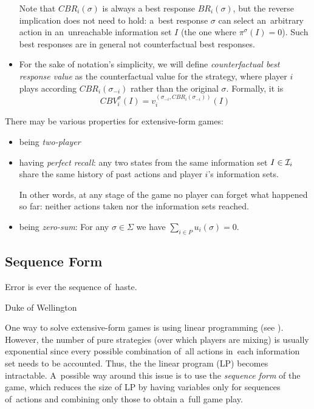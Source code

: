 \begin{itemize}
    Note that $CBR _i (\sigma)$ is always a best response $BR _i (\sigma)$, but the reverse implication does not need to hold:
    a~best response $\sigma$ can select an~arbitrary action in an~unreachable information set $I$ (the one where $\pi ^\sigma (I) = 0$).
    Such best responses are in general not counterfactual best responses.

  \item For the sake of notation's simplicity, we will define \emph{counterfactual best response value} as the counterfactual value for the strategy, where player $i$ plays according $CBR _i (\sigma _{-i})$ rather than the original $\sigma$.
    Formally, it is
    \[ CBV _i ^\sigma (I) = v _i ^{(\sigma _{-i}, CBR _i (\sigma _{-i} ))} (I) \]

\end{itemize}

There may be various properties for extensive-form games:

\begin{itemize}
  \item being \emph{two-player}
  \item having \emph{perfect recall}: any two states from the same information set $I \in \mathcal{I} _i$ share the same history of past actions and player $i$'s information sets.

    In other words, at any stage of the game no player can forget what happened so far:
    neither actions taken nor the information sets reached.
  \item being \emph{zero-sum}: For any $\sigma \in \Sigma$ we have $\sum _{i \in P} u _i (\sigma) = 0$.
\end{itemize}

\subsection{Sequence Form}
\epigraph{
  Error is ever the sequence of~haste.
}{Duke of Wellington}
One way to solve extensive-form games is using linear programming (see \cite{AGT07}).
However, the number of pure strategies (over which players are mixing) is usually exponential since every possible combination of~all actions in~each information set needs to be accounted.
Thus, the the linear program (LP) becomes intractable.
A~possible way around this issue is to use the \emph{sequence form} of the game, which reduces the size of LP by having variables only for sequences of~actions and combining only those to obtain a~full game play.

